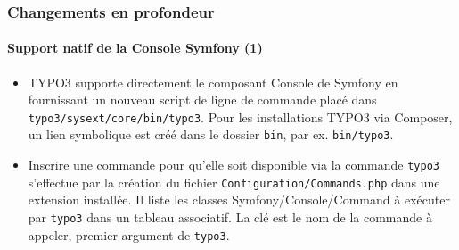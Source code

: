 \begin{frame}[fragile]
	\frametitle{Changements en profondeur}
	\framesubtitle{Support natif de la Console Symfony (1)}

	\lstset{basicstyle=\tiny\ttfamily}

	\begin{itemize}

		\item TYPO3 supporte directement le composant Console de Symfony en fournissant un
			nouveau script de ligne de commande placé dans \texttt{typo3/sysext/core/bin/typo3}.
			Pour les installations TYPO3 via Composer, un lien symbolique est créé dans le dossier
			\texttt{bin}, par ex. \texttt{bin/typo3}.

		\item Inscrire une commande pour qu'elle soit disponible via la commande
			\texttt{typo3} s'effectue par la création du fichier \texttt{Configuration/Commands.php}
			dans une extension installée. Il liste les classes Symfony/Console/Command
			à exécuter par \texttt{typo3} dans un tableau associatif. La clé est le nom de
			la commande à appeler, premier argument de \texttt{typo3}.

	\end{itemize}

\end{frame}

